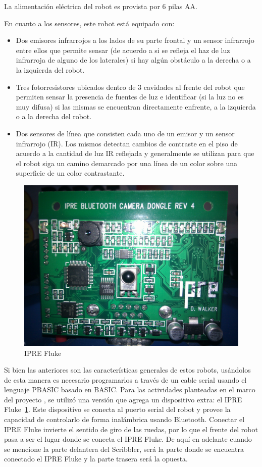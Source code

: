 La alimentación eléctrica del robot es provista por 6 pilas AA.

En cuanto a los sensores, este robot está equipado con:
\begin{itemize}
    \item Dos emisores infrarrojos a los lados de su parte frontal y un
        sensor infrarrojo entre ellos que permite sensar (de acuerdo a si se
        refleja el haz de luz infrarroja de alguno de los laterales) si
        hay algún obstáculo a la derecha o a la izquierda del robot.
    \item Tres fotorresistores ubicados dentro de 3 cavidades al frente del
        robot que permiten sensar la presencia de fuentes de luz e
        identificar (si la luz no es muy difusa) si las mismas se encuentran
        directamente enfrente, a la izquierda o a la derecha del robot.
    \item Dos sensores de línea que consisten cada uno de un emisor
        y un sensor infrarrojo (IR). Los mismos detectan cambios de contraste
        en el piso de acuerdo a la cantidad de luz IR reflejada y generalmente
        se utilizan para que el robot siga un camino demarcado por una línea
        de un color sobre una superficie de un color contrastante.
\end{itemize}

\begin{figure}
    \centering
    \includegraphics[width=0.5\linewidth]{figures/fluke}
    \caption{IPRE Fluke}
    \label{fig:foto_fluke}
\end{figure}

Si bien las anteriores son las características generales de estos robots, usándolos
de esta manera es necesario programarlos a través de un cable serial usando el
lenguaje PBASIC basado en BASIC. Para las actividades planteadas en el marco del
proyecto \proyecto{}, se utilizó  una versión
que agrega un dispositivo extra: el IPRE Fluke~\ref{fig:foto_fluke}.
Este dispositivo se conecta al puerto
serial del robot y provee la capacidad de controlarlo de forma inalámbrica
usando Bluetooth.  Conectar el
IPRE Fluke invierte el sentido de giro de las ruedas, por lo que el frente
del robot pasa a ser el lugar donde se conecta el IPRE Fluke. De aquí
en adelante cuando se mencione la parte delantera del Scribbler, será la
parte donde se encuentra conectado el IPRE Fluke y la parte trasera será la
opuesta.

